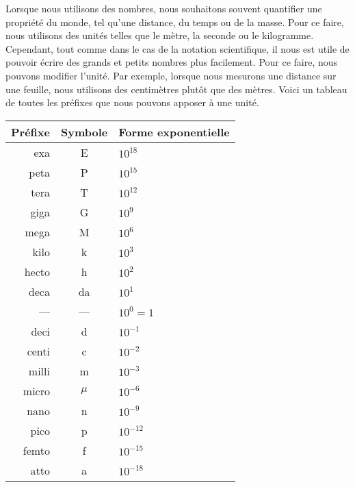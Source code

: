 Lorsque nous utilisons des nombres, nous souhaitons souvent quantifier une propriété du monde, tel qu'une distance, du temps ou de la masse. Pour ce faire, nous utilisons des unités telles que le mètre, la seconde ou le kilogramme. Cependant, tout comme dans le cas de la notation scientifique, il nous est utile de pouvoir écrire des grands et petits nombres plus facilement. Pour ce faire, nous pouvons modifier l'unité. Par exemple, lorsque nous mesurons une distance sur une feuille, nous utilisons des centimètres plutôt que des mètres. Voici un tableau de toutes les préfixes que nous pouvons apposer à une unité.
\begin{longtable}{rcl}
	\toprule
	\textbf{Préfixe} & \textbf{Symbole} & \textbf{Forme exponentielle} \\ \midrule
	exa & E & $10^{18}$ \\
	peta & P & $10^{15}$ \\
	tera & T & $10^{12}$ \\
	giga & G & $10^{9}$ \\
	mega & M & $10^{6}$ \\
	kilo & k & $10^{3}$ \\
	hecto & h & $10^{2}$ \\
	deca & da & $10^{1}$ \\
	--- & --- & $10^{0} = 1$ \\
	deci & d & $10^{-1}$ \\
	centi & c & $10^{-2}$ \\
	milli & m & $10^{-3}$ \\
	micro & $\mu$ & $10^{-6}$ \\
	nano & n & $10^{-9}$ \\
	pico & p & $10^{-12}$ \\
	femto & f & $10^{-15}$ \\
	atto & a & $10^{-18}$ \\ \bottomrule
\end{longtable}

